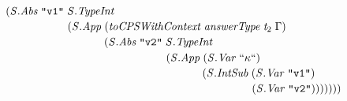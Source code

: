 \documentclass[10pt]{article}
\newcommand{\Conid}[1]{\mathit{#1}}
\newcommand{\Varid}[1]{\mathit{#1}}
\begin{document}
\begin{hscode}
${\hskip1.00em\relax\hskip1.00em\relax\phantom{\Conid{\Conid{S}.IntSub}\;\Varid{t}_{1}\;\Varid{t}_{2}\to \Conid{\Conid{S}.Abs}\;\text{``}\kappa\text{``}\;\mbox{}}\phantom{(\Conid{\Conid{S}.App}\;\mbox{}}(\Conid{\Conid{S}.Abs}\;\text{\tt \char34 v1\char34}\;\Conid{\Conid{S}.TypeInt}\;}$\\
${\hskip1.00em\relax\hskip1.00em\relax\phantom{\Conid{\Conid{S}.IntSub}\;\Varid{t}_{1}\;\Varid{t}_{2}\to \Conid{\Conid{S}.Abs}\;\text{``}\kappa\text{``}\;\mbox{}}\phantom{(\Conid{\Conid{S}.App}\;\mbox{}}\phantom{(\Conid{\Conid{S}.Abs}\;\text{\tt \char34 v1\char34}\;\mbox{}}(\Conid{\Conid{S}.App}\;(\Varid{toCPSWithContext}\;\Varid{answerType}\;\Varid{t}_{2}\;\Gamma)\;}$\\
${\hskip1.00em\relax\hskip1.00em\relax\phantom{\Conid{\Conid{S}.IntSub}\;\Varid{t}_{1}\;\Varid{t}_{2}\to \Conid{\Conid{S}.Abs}\;\text{``}\kappa\text{``}\;\mbox{}}\phantom{(\Conid{\Conid{S}.App}\;\mbox{}}\phantom{(\Conid{\Conid{S}.Abs}\;\text{\tt \char34 v1\char34}\;\mbox{}}\phantom{(\Conid{\Conid{S}.App}\;\mbox{}}(\Conid{\Conid{S}.Abs}\;\text{\tt \char34 v2\char34}\;\Conid{\Conid{S}.TypeInt}\;}$\\
${\hskip1.00em\relax\hskip1.00em\relax\phantom{\Conid{\Conid{S}.IntSub}\;\Varid{t}_{1}\;\Varid{t}_{2}\to \Conid{\Conid{S}.Abs}\;\text{``}\kappa\text{``}\;\mbox{}}\phantom{(\Conid{\Conid{S}.App}\;\mbox{}}\phantom{(\Conid{\Conid{S}.Abs}\;\text{\tt \char34 v1\char34}\;\mbox{}}\phantom{(\Conid{\Conid{S}.App}\;\mbox{}}\phantom{(\Conid{\Conid{S}.Abs}\;\text{\tt \char34 v2\char34}\;\mbox{}}(\Conid{\Conid{S}.App}\;(\Conid{\Conid{S}.Var}\;\text{``}\kappa\text{``})\;}$\\
${\hskip1.00em\relax\hskip1.00em\relax\phantom{\Conid{\Conid{S}.IntSub}\;\Varid{t}_{1}\;\Varid{t}_{2}\to \Conid{\Conid{S}.Abs}\;\text{``}\kappa\text{``}\;\mbox{}}\phantom{(\Conid{\Conid{S}.App}\;\mbox{}}\phantom{(\Conid{\Conid{S}.Abs}\;\text{\tt \char34 v1\char34}\;\mbox{}}\phantom{(\Conid{\Conid{S}.App}\;\mbox{}}\phantom{(\Conid{\Conid{S}.Abs}\;\text{\tt \char34 v2\char34}\;\mbox{}}\phantom{(\Conid{\Conid{S}.App}\;\mbox{}}(\Conid{\Conid{S}.IntSub}\;(\Conid{\Conid{S}.Var}\;\text{\tt \char34 v1\char34})\;}$\\
${\hskip1.00em\relax\hskip1.00em\relax\phantom{\Conid{\Conid{S}.IntSub}\;\Varid{t}_{1}\;\Varid{t}_{2}\to \Conid{\Conid{S}.Abs}\;\text{``}\kappa\text{``}\;\mbox{}}\phantom{(\Conid{\Conid{S}.App}\;\mbox{}}\phantom{(\Conid{\Conid{S}.Abs}\;\text{\tt \char34 v1\char34}\;\mbox{}}\phantom{(\Conid{\Conid{S}.App}\;\mbox{}}\phantom{(\Conid{\Conid{S}.Abs}\;\text{\tt \char34 v2\char34}\;\mbox{}}\phantom{(\Conid{\Conid{S}.App}\;\mbox{}}\phantom{(\Conid{\Conid{S}.IntSub}\;\mbox{}}(\Conid{\Conid{S}.Var}\;\text{\tt \char34 v2\char34})))))))}$\\

\end{hscode}
\end{document}
